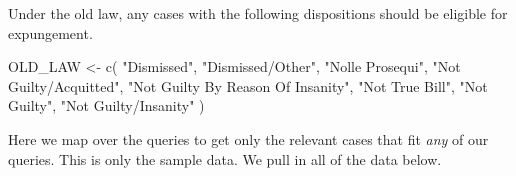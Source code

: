 \documentclass[
]{article}
\newenvironment{Shaded}{\begin{snugshade}}{\end{snugshade}}
\newcommand{\FunctionTok}[1]{\textcolor[rgb]{0.00,0.00,0.00}{#1}}
\newcommand{\NormalTok}[1]{#1}
\newcommand{\OtherTok}[1]{\textcolor[rgb]{0.56,0.35,0.01}{#1}}
\newcommand{\StringTok}[1]{\textcolor[rgb]{0.31,0.60,0.02}{#1}}
\begin{document}
Under the old law, any cases with the following dispositions should be
eligible for expungement.

\begin{Shaded}
\begin{Highlighting}[]
\NormalTok{OLD\_LAW }\OtherTok{\textless{}{-}} \FunctionTok{c}\NormalTok{(}
      \StringTok{"Dismissed"}\NormalTok{, }
      \StringTok{"Dismissed/Other"}\NormalTok{, }
      \StringTok{"Nolle Prosequi"}\NormalTok{, }
      \StringTok{"Not Guilty/Acquitted"}\NormalTok{, }
      \StringTok{"Not Guilty By Reason Of Insanity"}\NormalTok{, }
      \StringTok{"Not True Bill"}\NormalTok{, }
      \StringTok{"Not Guilty"}\NormalTok{, }
      \StringTok{"Not Guilty/Insanity"}
\NormalTok{    )}
\end{Highlighting}
\end{Shaded}

Here we map over the queries to get only the relevant cases that fit
\emph{any} of our queries. This is only the sample data. We pull in all
of the data below.
\end{document}
